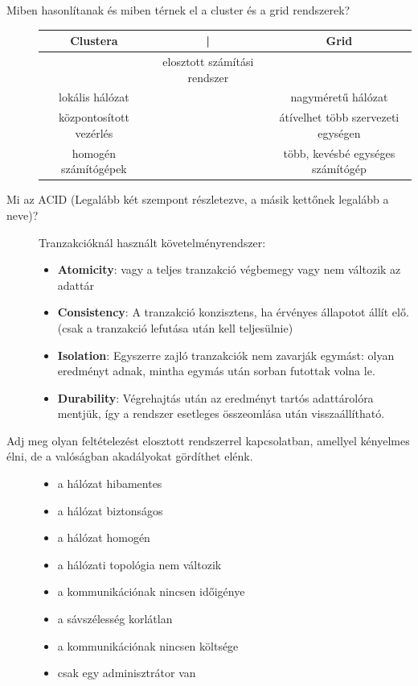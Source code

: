 \documentclass[12pt]{article}
\begin{document}
\begin{description}
\begin{itemize}
\begin{itemize}
                    \end{itemize}
            \end{itemize}
        \item[Miben hasonlítanak és miben térnek el a cluster és a grid
            rendszerek?]
            \hfill
                    \begin{tabular}{c c c}
                        Clustera & | & Grid\\
                        \hline
                        &elosztott számítási rendszer&\\
                        lokális hálózat&&nagyméretű hálózat\\
                        központosított vezérlés&&átívelhet több szervezeti egységen\\
                        homogén számítógépek&&több, kevésbé egységes számítógép\\
                    \end{tabular}
        \item[Mi az ACID (Legalább két szempont részletezve, a másik kettőnek legalább a neve)?]
            \hfill
            Tranzakcióknál használt követelményrendszer:
            \begin{itemize}
                \item \textbf{Atomicity}: vagy a teljes tranzakció végbemegy vagy nem változik az adattár
                \item \textbf{Consistency}: A tranzakció konzisztens, ha érvényes állapotot állít elő. (csak a tranzakció lefutása után kell teljesülnie)
                \item \textbf{Isolation}: Egyszerre zajló tranzakciók nem zavarják egymást: olyan eredményt adnak, mintha egymás után sorban futottak volna le.
                \item \textbf{Durability}: Végrehajtás után az eredményt tartós adattárolóra mentjük, így a rendszer esetleges összeomlása után visszaállítható.
            \end{itemize}
        \item[Adj meg olyan feltételezést elosztott rendszerrel kapcsolatban, amellyel kényelmes élni, de a valóságban akadályokat gördíthet elénk.]
            \hfill
            \begin{itemize}
                \item a hálózat hibamentes
                \item a hálózat biztonságos
                \item a hálózat homogén
                \item a hálózati topológia nem változik
                \item a kommunikációnak nincsen időigénye
                \item a sávszélesség korlátlan
                \item a kommunikációnak nincsen költsége
                \item csak egy adminisztrátor van
            \end{itemize}
    \end{description}
\end{document}
